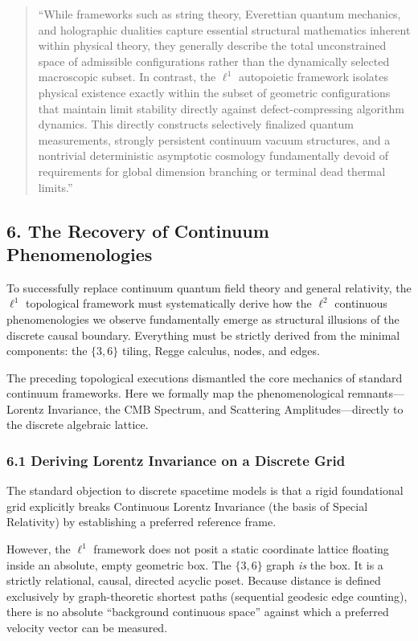 \documentclass[
]{article}
\begin{document}
\begin{quote}
``While frameworks such as string theory, Everettian quantum mechanics,
and holographic dualities capture essential structural mathematics
inherent within physical theory, they generally describe the total
unconstrained space of admissible configurations rather than the
dynamically selected macroscopic subset. In contrast, the \(\ell^1\)
autopoietic framework isolates physical existence exactly within the
subset of geometric configurations that maintain limit stability
directly against defect-compressing algorithm dynamics. This directly
constructs selectively finalized quantum measurements, strongly
persistent continuum vacuum structures, and a nontrivial deterministic
asymptotic cosmology fundamentally devoid of requirements for global
dimension branching or terminal dead thermal limits.''
\end{quote}

\subsection{6. The Recovery of Continuum
Phenomenologies}\label{the-recovery-of-continuum-phenomenologies}

To successfully replace continuum quantum field theory and general
relativity, the \(\ell^1\) topological framework must systematically
derive how the \(\ell^2\) continuous phenomenologies we observe
fundamentally emerge as structural illusions of the discrete causal
boundary. Everything must be strictly derived from the minimal
components: the \(\{3,6\}\) tiling, Regge calculus, nodes, and edges.

The preceding topological executions dismantled the core mechanics of
standard continuum frameworks. Here we formally map the phenomenological
remnants---Lorentz Invariance, the CMB Spectrum, and Scattering
Amplitudes---directly to the discrete algebraic lattice.

\subsubsection{6.1 Deriving Lorentz Invariance on a Discrete
Grid}\label{deriving-lorentz-invariance-on-a-discrete-grid}

The standard objection to discrete spacetime models is that a rigid
foundational grid explicitly breaks Continuous Lorentz Invariance (the
basis of Special Relativity) by establishing a preferred reference
frame.

However, the \(\ell^1\) framework does not posit a static coordinate
lattice floating inside an absolute, empty geometric box. The
\(\{3,6\}\) graph \emph{is} the box. It is a strictly relational,
causal, directed acyclic poset. Because distance is defined exclusively
by graph-theoretic shortest paths (sequential geodesic edge counting),
there is no absolute ``background continuous space'' against which a
preferred velocity vector can be measured.
\end{document}

